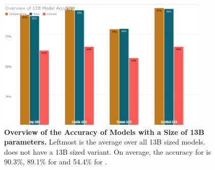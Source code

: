 \begin{figure}[!htbp]
    \begin{centering}
        \includegraphics[width=0.9\textwidth]{img/overview_13b_accuracy}
        \caption[Overview of 13B Models Accuracy]{\textbf{Overview of the Accuracy of Models with a Size of 13B parameters.}
        Leftmost is the average over all 13B sized models.
         does not have a 13B sized variant.
        On average, the accuracy for \ttemp is 90.3\%, 89.1\% for \ttime and 54.4\% for \tsolv.
        }
        \label{fig:13b_acc}
    \end{centering}
\end{figure}

